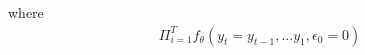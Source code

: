 \documentclass[./main.tex]{subfiles}
\begin{document}
where
\begin{align*}
    \Pi_{i=1}^{T} f_{\theta}( y_t = y_{t-1}, ...y_1, \epsilon_0 =0)
\end{align*}
\end{document}
